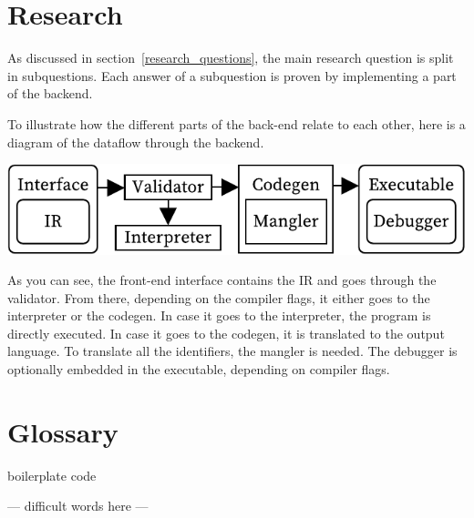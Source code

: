 \documentclass[10pt,a4paper]{article}
\begin{document}
\pagestyle{empty} 


\newpage

\setcounter{secnumdepth}{2} 
\setcounter{tocdepth}{2}

\setcounter{page}{1}
\pagestyle{plain}

\begin{multicols}{2}
\tableofcontents




\section{Research}
As discussed in section~\ref{research_questions}, the main research question is split in subquestions.
Each answer of a subquestion is proven by implementing a part of the backend. 

To illustrate how the different parts of the back-end relate to each other, here is a diagram of the dataflow through the backend.

\includegraphics[width=\columnwidth]{overview}

As you can see, the front-end interface contains the IR and goes through the validator.
From there, depending on the compiler flags, it either goes to the interpreter or the codegen.
In case it goes to the interpreter, the program is directly executed.
In case it goes to the codegen, it is translated to the output language.
To translate all the identifiers, the mangler is needed.
The debugger is optionally embedded in the executable, depending on compiler flags.











\printbibliography

\setcounter{section}{0}
\renewcommand\thesection{\Alph{section}}

\section{Glossary}
boilerplate code

--- difficult words here ---

\end{multicols}
\end{document}
